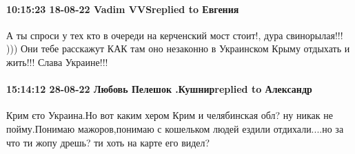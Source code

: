  
 
 
 
 

\paragraph{10:15:23 18-08-22 Vadim VVSreplied to Евгения}

А ты спроси у тех кто в очереди на керченский мост стоит!, дура свинорылая!!!
))) Они тебе расскажут КАК там оно незаконно в Украинском Крыму отдыхать и
жить!!! Слава Украине!!!

\paragraph{15:14:12 28-08-22 Любовь Пелешок .Кушнирreplied to Александр}

Крим єто Украина.Но вот каким хером Крим и челябинская обл? ну никак не
пойму.Понимаю мажоров,понимаю с кошельком людей ездили отдихали....но за что ти
жопу дрешь? ти хоть на карте его видел?
